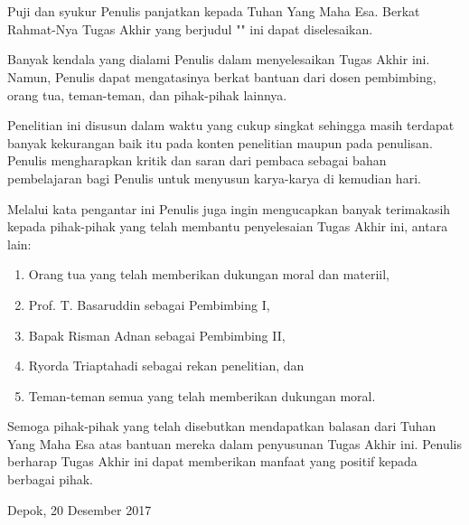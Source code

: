 \chapter*{\kataPengantar}
Puji dan syukur Penulis panjatkan kepada Tuhan Yang Maha Esa. Berkat Rahmat-Nya Tugas Akhir yang berjudul "\judul" ini dapat diselesaikan.

Banyak kendala yang dialami Penulis dalam menyelesaikan Tugas Akhir ini. Namun, Penulis dapat mengatasinya berkat bantuan dari dosen pembimbing, orang tua, teman-teman, dan pihak-pihak lainnya.
 
Penelitian ini disusun dalam waktu yang cukup singkat sehingga masih terdapat banyak kekurangan baik itu pada konten penelitian maupun pada penulisan. 
Penulis mengharapkan kritik dan saran dari pembaca sebagai bahan pembelajaran bagi Penulis untuk menyusun karya-karya di kemudian hari.

Melalui kata pengantar ini Penulis juga ingin mengucapkan banyak terimakasih kepada pihak-pihak yang telah membantu penyelesaian Tugas Akhir ini, antara lain:

\begin{enumerate}
	\item Orang tua yang telah memberikan dukungan moral dan materiil,
	\item Prof. T. Basaruddin sebagai Pembimbing I,
	\item Bapak Risman Adnan sebagai Pembimbing II, 
	\item Ryorda Triaptahadi sebagai rekan penelitian, dan
	\item Teman-teman semua yang telah memberikan dukungan moral. 
\end{enumerate}

Semoga pihak-pihak yang telah disebutkan mendapatkan balasan dari Tuhan Yang Maha Esa atas bantuan mereka dalam penyusunan Tugas Akhir ini. Penulis berharap Tugas Akhir ini dapat memberikan manfaat yang positif kepada berbagai pihak. 


\vspace*{0.1cm}
\begin{flushright}
Depok, 20 Desember 2017\\[0.1cm]
\vspace*{1cm}
\penulis

\end{flushright}